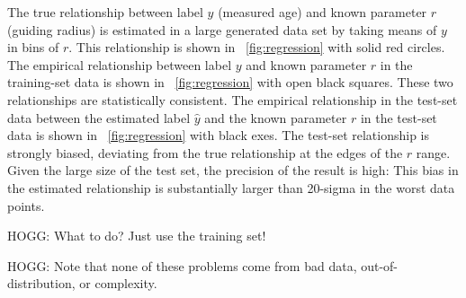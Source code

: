 \documentclass[11pt]{article}
\begin{document}
The true relationship between label $y$ (measured age) and known parameter $r$ (guiding radius) is estimated in a large generated data set by taking means of $y$ in bins of $r$.
This relationship is shown in \figurename~\ref{fig:regression} with solid red circles.
The empirical relationship between label $y$ and known parameter $r$ in the training-set data is shown in \figurename~\ref{fig:regression} with open black squares.
These two relationships are statistically consistent.
The empirical relationship in the test-set data between the estimated label $\hat{y}$ and the known parameter $r$ in the test-set data is shown in \figurename~\ref{fig:regression} with black exes.
The test-set relationship is strongly biased, deviating from the true relationship at the edges of the $r$ range.
Given the large size of the test set, the precision of the result is high: This bias in the estimated relationship is substantially larger than 20-sigma in the worst data points.

HOGG: What to do? Just use the training set!

HOGG: Note that none of these problems come from bad data, out-of-distribution, or complexity.
\end{document}
